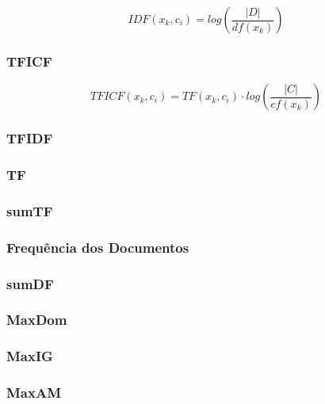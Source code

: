 \cite{ChihHow04}
\begin{equation}\label{eqn::tficf}
   IDF(x_k, c_i) = log( \frac{|D|} {df(x_k)} )
\end{equation}


\subsubsection{TFICF}
\label{subsubsection::tfidf}
\cite{ChihHow04}
\begin{equation}\label{eqn::tficf}
   TFICF(x_k, c_i) = TF(x_k, c_i) \cdot log( \frac{|C|} {cf(x_k)} )
\end{equation}


\subsubsection{TFIDF}
\label{subsubsection::tfidf}

\subsubsection{TF}
\label{subsubsection::tf}

\subsubsection{sumTF}
\label{subsubsection::sumtf}

\subsubsection{Frequência dos Documentos}
\label{subsubsection::df}


\subsubsection{sumDF}
\label{subsubsection::sumdf}

\subsubsection{MaxDom}
\label{subsubsection::maxdom}

\subsubsection{MaxIG}
\label{subsubsection::maxig}

\subsubsection{MaxAM}
\label{subsubsection::maxam}

